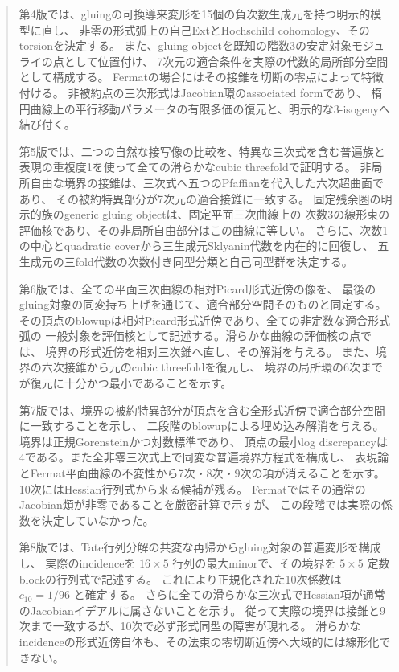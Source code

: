 \documentclass[a4paper,11pt]{ltjsarticle}
\theoremstyle{definition}
\begin{document}
\begin{abstract}
第4版では、gluingの可換導来変形を15個の負次数生成元を持つ明示的模型に直し、
非零の形式弧上の自己ExtとHochschild cohomology、そのtorsionを決定する。
また、gluing objectを既知の階数3の安定対象モジュライの点として位置付け、
7次元の適合条件を実際の代数的局所部分空間として構成する。
Fermatの場合にはその接錐を切断の零点によって特徴付ける。
非被約点の三次形式はJacobian環のassociated formであり、
楕円曲線上の平行移動パラメータの有限多価の復元と、明示的な3-isogenyへ結び付く。

第5版では、二つの自然な接写像の比較を、特異な三次式を含む普遍族と
表現の重複度1を使って全ての滑らかなcubic threefoldで証明する。
非局所自由な境界の接錐は、三次式へ五つのPfaffianを代入した六次超曲面であり、
その被約特異部分が7次元の適合接錐に一致する。
固定残余圏の明示的族のgeneric gluing objectは、固定平面三次曲線上の
次数3の線形束の評価核であり、その非局所自由部分はこの曲線に等しい。
さらに、次数1の中心とquadratic coverから三生成元Sklyanin代数を内在的に回復し、
五生成元の三fold代数の次数付き同型分類と自己同型群を決定する。

第6版では、全ての平面三次曲線の相対Picard形式近傍の像を、
最後のgluing対象の同変持ち上げを通じて、適合部分空間そのものと同定する。
その頂点のblowupは相対Picard形式近傍であり、全ての非定数な適合形式弧の
一般対象を評価核として記述する。滑らかな曲線の評価核の点では、
境界の形式近傍を相対三次錐へ直し、その解消を与える。
また、境界の六次接錐から元のcubic threefoldを復元し、
境界の局所環の6次までが復元に十分かつ最小であることを示す。

第7版では、境界の被約特異部分が頂点を含む全形式近傍で適合部分空間に一致することを示し、
二段階のblowupによる埋め込み解消を与える。境界は正規Gorensteinかつ対数標準であり、
頂点の最小log discrepancyは4である。また全非零三次式上で同変な普遍境界方程式を構成し、
表現論とFermat平面曲線の不変性から7次・8次・9次の項が消えることを示す。
10次にはHessian行列式から来る候補が残る。
Fermatではその通常のJacobian類が非零であることを厳密計算で示すが、
この段階では実際の係数を決定していなかった。

第8版では、Tate行列分解の共変な再帰からgluing対象の普遍変形を構成し、
実際のincidenceを $16\times5$ 行列の最大minorで、その境界を
$5\times5$ 定数blockの行列式で記述する。
これにより正規化された10次係数は $c_{10}=1/96$ と確定する。
さらに全ての滑らかな三次式でHessian項が通常のJacobianイデアルに属さないことを示す。
従って実際の境界は接錐と9次まで一致するが、10次で必ず形式同型の障害が現れる。
滑らかなincidenceの形式近傍自体も、その法束の零切断近傍へ大域的には線形化できない。


\end{abstract}
\end{document}
